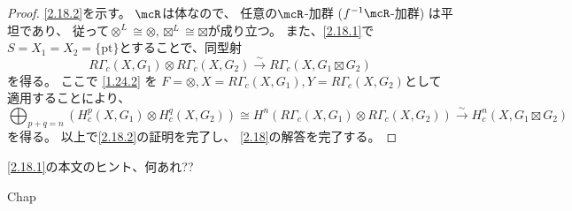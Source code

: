 \documentclass[uplatex,dvipdfmx]{jsarticle}
\begin{document}
\begin{proof}
  \ref{2.18.2}を示す。
  \(\mcR\)は体なので、
  任意の\(\mcR\)-加群 (\(f^{-1}\mcR\)-加群) は平坦であり、
  従って\(\otimes^L\cong \otimes, \boxtimes^L\cong \boxtimes\)が成り立つ。
  また、\ref{2.18.1}で\(S=X_1=X_2=\{\mathrm{pt}\}\)とすることで、同型射
  \[
  R\Gamma_c(X,G_1)\otimes R\Gamma_c(X,G_2) \xrightarrow{\sim}
  R\Gamma_c(X,G_1\boxtimes G_2)
  \]
  を得る。
  ここで \autoref{1.24.2} を
  \(F=\otimes, X=R\Gamma_c(X,G_1), Y=R\Gamma_c(X,G_2)\)として適用することにより、
  \[
  \bigoplus_{p+q=n}(H^p_c(X,G_1)\otimes H^q_c(X,G_2))
  \cong H^n(R\Gamma_c(X,G_1)\otimes R\Gamma_c(X,G_2))
  \xrightarrow{\sim} H^n_c(X,G_1\boxtimes G_2)
  \]
  を得る。
  以上で\ref{2.18.2}の証明を完了し、
  \autoref{2.18}の解答を完了する。
\end{proof}

\begin{kansou*}
  \ref{2.18.1}の本文のヒント、何あれ??
\end{kansou*}






\ifcsname Chap\endcsname\else
\printbibliography
\end{document}
